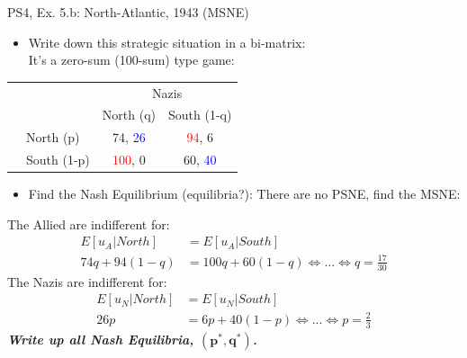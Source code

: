 \begin{frame}{PS4, Ex. 5.b: North-Atlantic, 1943 (MSNE)}
    \begin{itemize}
      \item[(a)] Write down this strategic situation in a bi-matrix: \\ It's a zero-sum (100-sum) type game:
    \end{itemize}
    \vspace{-12pt}
    \begin{table}
      \begin{tabular}{cl|c|c|}
          & \multicolumn{1}{c}{} & \multicolumn{2}{c}{\color{blue}Nazis}\\
          \parbox[t]{1mm}{}
          &  &  &  \\
          & North (p)    & 74, \textcolor{blue}{26} & \textcolor{red}{94}, 6 \\
          & South (1-p)  & \textcolor{red}{100}, 0 & 60, \textcolor{blue}{40} \\
      \end{tabular}
    \end{table}
    \begin{itemize}
      \item[(b)] Find the Nash Equilibrium (equilibria?): There are no PSNE, find the MSNE:
    \end{itemize}
    The Allied are indifferent for:
    \begin{align*}
      E[u_A|North]&=E[u_A|South]\\
      74q + 94(1-q) &= 100q + 60(1-q) \Leftrightarrow ... \Leftrightarrow q = \frac{17}{30}
    \end{align*}
    The Nazis are indifferent for:
    \begin{align*}
      E[u_N|North]&=E[u_N|South]\\
      26p &= 6p + 40(1-p) \Leftrightarrow ... \Leftrightarrow p = \frac{2}{3}
    \end{align*}
    \textbf{\textit{Write up all Nash Equilibria, $\bm{(p^{*},q^{*})}$.}}
  \vfill\null
\end{frame}
